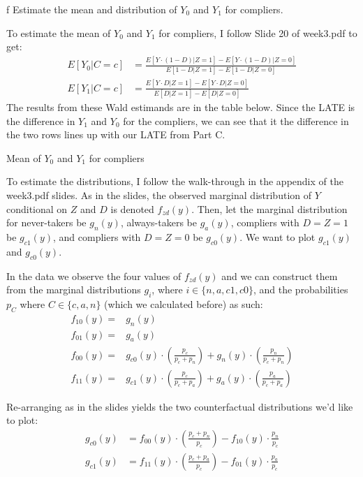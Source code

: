 \documentclass{article}
\begin{document}
\begin{problem}{f}
Estimate the mean and distribution of $Y_{0}$ and $Y_{1}$ for compliers.
\end{problem}
\begin{solution}
To estimate the mean of $Y_0$ and $Y_1$ for compliers, I follow Slide 20 of week3.pdf to get:
\begin{align*}
    E[Y_0|C=c] &= \frac{ E[ Y \cdot (1-D) | Z=1] - E[Y \cdot (1-D) | Z=0] }{ E[1-D|Z=1]-E[1-D|Z=0] } \\
    E[Y_1|C=c] &= \frac{ E[ Y \cdot D | Z=1] - E[Y \cdot D | Z=0] }{ E[D|Z=1]-E[D|Z=0] }
\end{align*}
The results from these Wald estimands are in the table below. Since the LATE is the difference in $Y_1$ and $Y_0$ for the compliers, we can see that it the difference in the two rows lines up with our LATE from Part C.

\begin{table}[H]
    \centering
    
    \caption{Mean of $Y_0$ and $Y_1$ for compliers}
\end{table}

To estimate the distributions, I follow the walk-through in the appendix of the week3.pdf slides. As in the slides, the observed marginal distribution of $Y$ conditional on $Z$ and $D$ is denoted $f_{zd}(y)$. Then, let the marginal distribution for never-takers be $g_n(y)$, always-takers be $g_a(y)$, compliers with $D=Z=1$ be $g_{c1}(y)$, and compliers with $D=Z=0$ be $g_{c0}(y)$. We want to plot $g_{c1}(y)$ and $g_{c0}(y)$.

In the data we observe the four values of $f_{zd}(y)$ and we can construct them from the marginal distributions $g_i$, where $i \in \{n,a,c1,c0\}$, and the probabilities $p_C$ where $C \in \{c,a,n \}$ (which we calculated before) as such:
\begin{align*}
    f_{10}(y)=& g_{n}(y) \\
    f_{01}(y)=& g_{a}(y) \\
    f_{00}(y)=& g_{c0}(y) \cdot \left(\frac{p_{c}}{p_{c}+p_{n}}\right) 
        + g_{n}(y) \cdot \left( \frac{p_{n}}{p_{c}+p_{n}} \right) \\
    f_{11}(y)=& g_{c 1}(y) \cdot \left(\frac{p_{c}}{p_{c}+p_{a}} \right) 
        + g_{a}(y) \cdot \left(\frac{p_{a}}{p_{c}+p_{a}} \right)
\end{align*}

Re-arranging as in the slides yields the two counterfactual distributions we'd like to plot:
\begin{align*}
    g_{c0}(y) &= f_{00}(y) \cdot \left(\frac{p_{c}+p_{n}}{p_{c}}\right) - f_{10}(y) \cdot \frac{p_{n}}{p_{c}} \\
    g_{c1}(y) &= f_{11}(y) \cdot \left(\frac{p_{c}+p_{a}}{p_{c}}\right) - f_{01}(y) \cdot \frac{p_{a}}{p_{c}}
\end{align*}


\end{solution}
\end{document}
